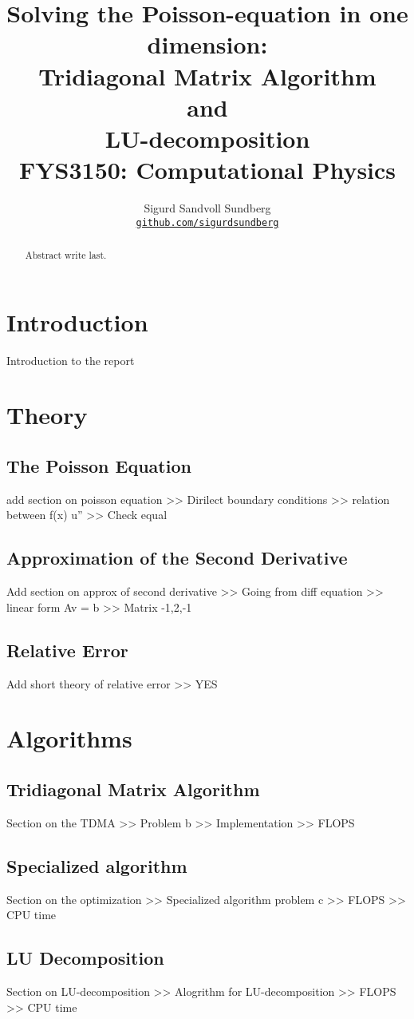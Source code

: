 \documentclass[10pt, a4paper]{amsart}
\title[Solving the Poisson-equation in one dimension]{Solving the Poisson-equation in one dimension: \\
\normalsize{Tridiagonal Matrix Algorithm\\
 and \\
 LU-decomposition} \\
  \hrulefill\small{ FYS3150: Computational Physics }\hrulefill}
\author[Sundberg]{Sigurd Sandvoll Sundberg \\
  \href{https://https://github.com/SigurdSundberg/FYS3150/}{\texttt{github.com/sigurdsundberg}}}
\begin{document}
\begin{titlepage}
\begin{abstract}
Abstract write last.
\end{abstract}
\maketitle
\tableofcontents
\end{titlepage}

\section{Introduction}
Introduction to the report

\section{Theory}
\subsection{The Poisson Equation}
add section on poisson equation
>> Dirilect boundary conditions >> relation between f(x) u'' >> Check equal
\subsection{Approximation of the Second Derivative}
Add section on approx of second derivative
>> Going from diff equation >> linear form Av = b >> Matrix -1,2,-1
\subsection{Relative Error}
Add short theory of relative error
>> YES

\section{Algorithms}
\subsection{Tridiagonal Matrix Algorithm}
Section on the TDMA
>> Problem b >> Implementation >> FLOPS
\subsection{Specialized algorithm}
Section on the optimization
>> Specialized algorithm problem c >> FLOPS >> CPU time
\subsection{LU Decomposition}
Section on LU-decomposition
>> Alogrithm for LU-decomposition >> FLOPS >> CPU time
\end{document}
